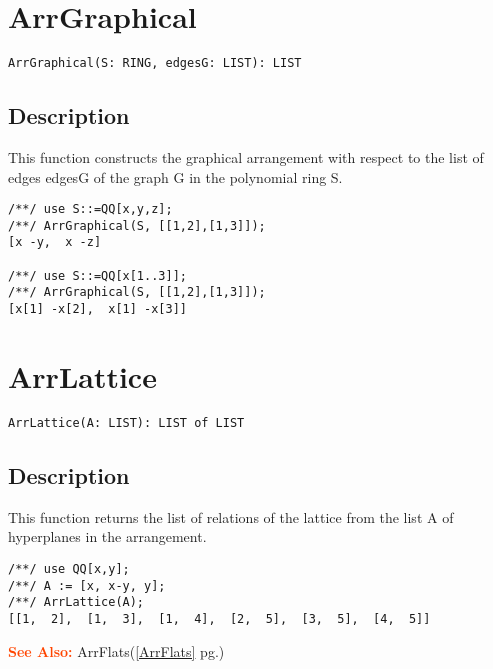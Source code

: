 \documentclass[a4paper]{mybook}
\newenvironment{command}{}{} %
\newcommand\SeeAlso{\par\textcolor{OrangeRed}{\textbf{\large See Also: }}}
\begin{document}
\section{ArrGraphical}
\label{ArrGraphical}
\begin{command} %


\begin{Verbatim}[label=syntax, rulecolor=\color{MidnightBlue},
frame=single]
ArrGraphical(S: RING, edgesG: LIST): LIST 
\end{Verbatim}


\subsection*{Description}

This function constructs the graphical arrangement with respect to the
list of edges edgesG of the graph G in the polynomial ring S.
\begin{Verbatim}[label=example, rulecolor=\color{PineGreen}, frame=single]
/**/ use S::=QQ[x,y,z];	
/**/ ArrGraphical(S, [[1,2],[1,3]]);
[x -y,  x -z]

/**/ use S::=QQ[x[1..3]];	
/**/ ArrGraphical(S, [[1,2],[1,3]]);
[x[1] -x[2],  x[1] -x[3]]
\end{Verbatim}


\end{command} %

\section{ArrLattice}
\label{ArrLattice}
\begin{command} %


\begin{Verbatim}[label=syntax, rulecolor=\color{MidnightBlue},
frame=single]
ArrLattice(A: LIST): LIST of LIST 
\end{Verbatim}


\subsection*{Description}

This function returns the list of relations of the lattice from the
list A of hyperplanes in the arrangement.
\begin{Verbatim}[label=example, rulecolor=\color{PineGreen}, frame=single]
/**/ use QQ[x,y];	
/**/ A := [x, x-y, y];
/**/ ArrLattice(A);
[[1,  2],  [1,  3],  [1,  4],  [2,  5],  [3,  5],  [4,  5]]
\end{Verbatim}


\SeeAlso %
  ArrFlats(\ref{ArrFlats} pg.\pageref{ArrFlats})
\end{command} %
\end{document}

